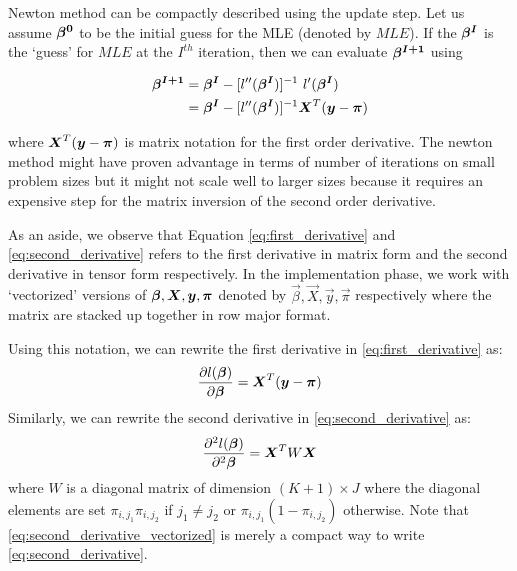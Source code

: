 Newton method can be compactly described using the update step. Let us assume
$\boldsymbol{\beta^0}$ to be the initial guess for the MLE (denoted by $MLE$). If the
$\boldsymbol{\beta^I}$ is the `guess' for $MLE$ at the $I^{th}$ iteration, then we can
evaluate $\boldsymbol{\beta^{I+1}}$ using

\begin{align}\label{eq:update}
\bS{\beta^{I+1}} &= \bS{\beta^{I}} - [l''(\bS{\beta^{I}})]^{-1}  \ l'(\bS{\beta^{I}}) \\
&= \bS{\beta^{I}} - [l''(\bS{\beta^{I}})]^{-1}  \bS{X}^{T} (\bS{y} - \bS{\pi})
\end{align}

where $\boldsymbol{X}^{T} (\boldsymbol{y} - \boldsymbol{\pi})$ is matrix notation for the first order
derivative. The newton method might have proven advantage in terms of number of
iterations on small problem sizes but it might not scale well to larger sizes
because it requires an expensive step for the matrix inversion of the second
order derivative.

As an aside, we observe that Equation \eqref{eq:first_derivative} and
\eqref{eq:second_derivative} refers to the first derivative in matrix form and
the second derivative in tensor form respectively. In the implementation phase,
we work with `vectorized' versions of $\boldsymbol{\beta},\boldsymbol{X},\boldsymbol{y}, \boldsymbol{\pi}$
denoted by $\vec{\beta},\vec{X},\vec{y}, \vec{\pi}$ respectively where the
matrix are stacked up together in row major format.

Using this notation, we can rewrite the first derivative in \eqref{eq:first_derivative} as:
\begin{equation}\label{eq:first_derivative_vectorized}
\frac{\partial l(\boldsymbol{\beta})}{\partial \boldsymbol{\beta}} = \boldsymbol{X}^{T} (\boldsymbol{y} - \boldsymbol{\pi})
\end{equation}
Similarly, we can rewrite the second derivative in  \eqref{eq:second_derivative} as:
\begin{equation}\label{eq:second_derivative_vectorized}
\frac{\partial^2 l(\boldsymbol{\beta})}{\partial^2 \boldsymbol{\beta}} = \boldsymbol{X}^{T} W \boldsymbol{X}
\end{equation}
where $W$ is a diagonal matrix of dimension $(K+1) \times J $ where the diagonal
elements are set $\pi_{i,j_1}\pi_{i,j_2}$ if $j_1 \neq j_2$ or
$\pi_{i,j_1}(1-\pi_{i,j_2})$ otherwise. Note that
\eqref{eq:second_derivative_vectorized} is merely a compact way to write
\eqref{eq:second_derivative}.

